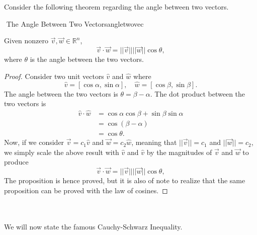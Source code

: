         \vphantom
        \\
        \\
        Consider the following theorem regarding the angle between two vectors.
        \begin{theorem}{\Stop\,\,The Angle Between Two Vectors}{angletwovec}
        
            Given nonzero \(\vec{v},\vec{w}\in\mathbb{R}^n\),
            \begin{equation*}
                \vec{v}\cdot\vec{w}=||\vec{v}||||\vec{w}||\cos\theta,
            \end{equation*}
            where \(\theta\) is the angle between the two vectors.
            \begin{proof}
                Consider two unit vectors \(\hat{v}\) and \(\hat{w}\) where
                \begin{equation*}
                    \hat{v}=[\cos\alpha,\sin\alpha],\quad\hat{w}=[\cos\beta,\sin\beta].
                \end{equation*}
                The angle between the two vectors is \(\theta=\beta-\alpha\). The dot product between the two vectors is
                \begin{align*}
                    \hat{v}\cdot\hat{w}&=\cos\alpha\cos\beta+\sin\beta\sin\alpha \\
                    &=\cos(\beta-\alpha) \\
                    &=\cos\theta.
                \end{align*}
                Now, if we consider \(\vec{v}=c_1\hat{v}\) and \(\vec{w}=c_2\hat{w}\), meaning that \(||\vec{v}||=c_1\) and \(||\vec{w}||=c_2\), we simply scale the above result with \(\hat{v}\) and \(\hat{v}\) by the magnitudes of \(\vec{v}\) and \(\vec{w}\) to produce
                \begin{equation*}
                \vec{v}\cdot\vec{w}=||\vec{v}||||\vec{w}||\cos\theta,
            \end{equation*}
                The proposition is hence proved, but it is also of note to realize that the same proposition can be proved with the law of cosines.
            \end{proof}
        
        \end{theorem}
        \pagebreak
        \vphantom
        \\
        \\
        We will now state the famous Cauchy-Schwarz Inequality.
